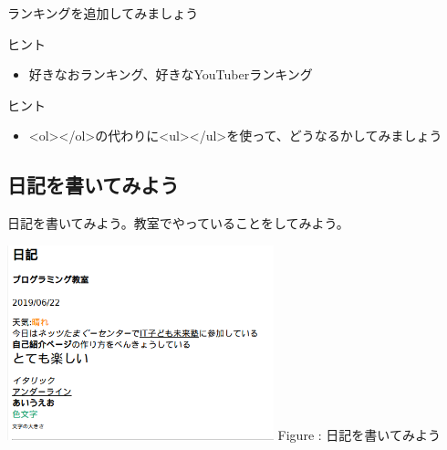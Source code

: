 \documentclass[a4paper,12pt]{jarticle}
\begin{document}
\bigskip


\bigskip


\theQuestion\label{Q:hasAnswer04-6}

ランキングを追加してみましょう

ヒント

\begin{itemize}
  \item
        好きなおランキング、好きなYouTuberランキング
\end{itemize}


\bigskip

\bigskip

\theQuestion\label{Q:hasAnswer04-7}

ヒント

\begin{itemize}
  \item
        {\textless}ol{\textgreater}{\textless}/ol{\textgreater}の代わりに{\textless}ul{\textgreater}{\textless}/ul{\textgreater}を使って、どうなるかしてみましょう
\end{itemize}



\bigskip

\clearpage
{}
\subsection{\theExercise 日記を書いてみよう}
日記を書いてみよう。教室でやっていることをしてみよう。

\centering
\begin{minipage}{6.32cm}
  {\upshape
    \includegraphics[width=7.724cm,height=5.643cm]{textbook-img185.png}
    \newline
    Figure : 日記を書いてみよう}
\end{minipage}
\end{document}
